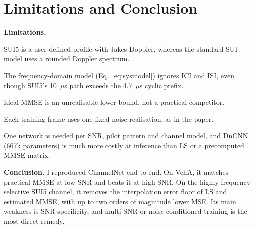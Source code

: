 \documentclass[a4paper,10pt]{article}
\newenvironment{packed_enum}{
\begin{enumerate}
  \setlength{\itemsep}{1.5pt}
  \setlength{\parskip}{0pt}
  \setlength{\parsep}{0pt}
}{\end{enumerate}}
\begin{document}
\section{Limitations and Conclusion}
\textbf{Limitations.}
\begin{packed_enum}
    \item SUI5 is a user-defined profile with Jakes Doppler, whereas the standard SUI model uses a rounded Doppler spectrum.
    \item The frequency-domain model (Eq.~\ref{eq:sysmodel}) ignores ICI and ISI, even though SUI5's 10~$\mu$s path exceeds the 4.7~$\mu$s cyclic prefix.
    \item Ideal MMSE is an unrealisable lower bound, not a practical competitor.
    \item Each training frame uses one fixed noise realisation, as in the paper.
    \item One network is needed per SNR, pilot pattern and channel model, and DnCNN (667k parameters) is much more costly at inference than LS or a precomputed MMSE matrix.
\end{packed_enum}

\textbf{Conclusion.} I reproduced ChannelNet end to end. On VehA, it matches practical MMSE at low SNR and beats it at high SNR. On the highly frequency-selective SUI5 channel, it removes the interpolation error floor of LS and estimated MMSE, with up to two orders of magnitude lower MSE. Its main weakness is SNR specificity, and multi-SNR or noise-conditioned training is the most direct remedy.
\end{document}
